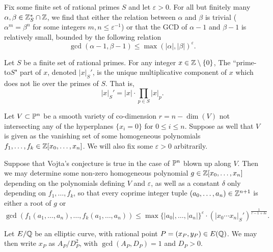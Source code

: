 \documentclass[12pt]{article}
\begin{document}
\begin{theorem}
    Fix some finite set of rational primes $S$ and let $\varepsilon > 0$. For all but finitely many $\alpha, \beta \in \mathbb{Z}_S^* \cap \mathbb{Z}$, we find that either the relation between $\alpha$ and $\beta$ is trivial ($\alpha^m = \beta^n$ for some integers $m, n \leq \varepsilon^{-1}$) or that the GCD of $\alpha -1$ and $\beta - 1$ is relatively small, bounded by the following relation
    \[
        \gcd(\alpha - 1, \beta - 1) \leq \max(|\alpha|, |\beta|)^\varepsilon. 
    \]
\end{theorem}

\begin{definition}
    Let $S$ be a finite set of rational primes. For any integer $x \in \mathbb{Z} \setminus \{ 0 \}$, The ``prime-to$S$" part of $x$, denoted $|x|_S'$, is the unique multiplicative component of $x$ which does not lie over the primes of $S$. That is,
    \[
        |x|_S' = |x| \cdot \prod_{p \in S} |x|_p.
    \]
\end{definition}

\begin{theorem}
    Let $V \subset \mathbb{P}^n$ be a smooth variety of co-dimension $r = n - \dim(V)$ not intersecting any of the hyperplanes $\{x_i = 0\}$ for $0 \leq i \leq n$.
    Suppose as well that $V$ is given as the vanishing set of some homogeneous polynomials $f_1, \ldots, f_k \in \mathbb{Z}[x_0, \ldots, x_n]$.
    We will also fix some $\varepsilon > 0$ arbitrarily.

    Suppose that Vojta's conjecture is true in the case of $\mathbb{P}^n$ blown up along $V$.
    Then we may determine some non-zero homogeneous polynomial $g \in \mathbb{Z}[x_0, \ldots, x_n]$ depending on the polynomials defining $V$ and $\varepsilon$, as well as a constant $\delta$ only depending on $f_1, \ldots, f_k$, so that every coprime integer tuple $(a_0, \ldots, a_n) \in \mathbb{Z}^{n + 1}$ is either a root of $g$ or
    \[
        \gcd(f_1(a_1, \ldots, a_n), \ldots, f_k(a_1, \ldots, a_n))
            \leq \max\{|a_0|, \ldots, |a_n|\}^\varepsilon
                \cdot (|x_0 \cdots x_n|_S')^{\frac{1}{r - 1 + \delta \varepsilon}}.
    \]
    
\end{theorem}


\begin{notation}
    Let $E / \mathbb{Q}$ be an elliptic curve, with rational point $P = (x_P, y_P) \in E(\mathbb{Q})$.
    We may then write $x_P$ as $A_P / D_P^2$, with $\gcd(A_P, D_P) = 1$ and $D_P > 0$.
\end{notation}
\end{document}
